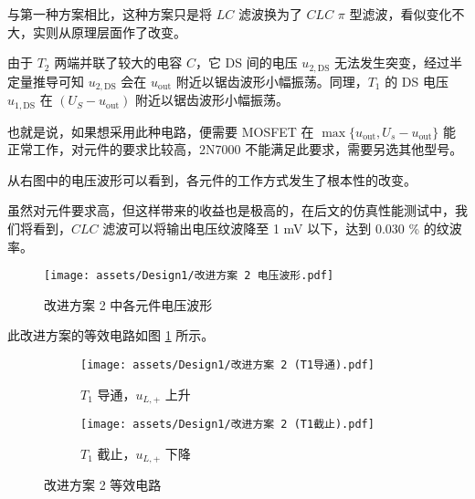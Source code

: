\documentclass[UTF8]{article}
\theoremstyle{MyLineTheoremStyle} %
\theoremstyle{MyBlockTheoremStyle} %
\theoremstyle{MySubsubsectionStyle} %
\begin{document}
\begin{center}
\noindent\begin{minipage}{0.42\columnwidth}
    \hspace*{2em} 与第一种方案相比，这种方案只是将 $LC$ 滤波换为了 $CLC$ $\pi$ 型滤波，看似变化不大，实则从原理层面作了改变。
    
    \hspace*{2em} 由于 $T_2$ 两端并联了较大的电容 $C$，它 DS 间的电压 $u_{2, \text{DS}}$ 无法发生突变，经过半定量推导可知 $u_{2, \text{DS}}$ 会在 $u_{\text{out}}$ 附近以锯齿波形小幅振荡。同理，$T_1$ 的 DS 电压 $u_{1, \text{DS}}$ 在 $(U_S - u_{\text{out}})$ 附近以锯齿波形小幅振荡。
    
    \hspace*{2em} 也就是说，如果想采用此种电路，便需要 MOSFET 在  $\max \{u_{\text{out}} , U_s - u_{\text{out}}\}$ 能正常工作，对元件的要求比较高，2N7000 不能满足此要求，需要另选其他型号。
    
    \hspace*{2em} 从右图中的电压波形可以看到，各元件的工作方式发生了根本性的改变。

    \hspace*{2em} 虽然对元件要求高，但这样带来的收益也是极高的，在后文的仿真性能测试中，我们将看到，$CLC$ 滤波可以将输出电压纹波降至 1 mV 以下，达到 0.030   \% 的纹波率。
    \hspace*{2em} 
\end{minipage}\hspace*{8mm}\begin{minipage}{0.45\columnwidth}
    \begin{figure}[H]\centering
        \texttt{[image: assets/Design1/改进方案 2 电压波形.pdf]}
        \caption{改进方案 2 中各元件电压波形}
    \end{figure}
\end{minipage}\end{center}

此改进方案的等效电路如图 \ref{改进方案 2 等效电路} 所示。
\begin{figure}[H]\centering
\begin{subfigure}[b]{0.5\columnwidth}\centering
    \texttt{[image: assets/Design1/改进方案 2 (T1导通).pdf]}
    \caption{$T_1$ 导通，$u_{L, +}$ 上升}
\end{subfigure}\hfill
\begin{subfigure}[b]{0.5\columnwidth}\centering
    \texttt{[image: assets/Design1/改进方案 2 (T1截止).pdf]}
    \caption{$T_1$ 截止，$u_{L, +}$ 下降}
\end{subfigure}
\caption{改进方案 2 等效电路}
\label{改进方案 2 等效电路}
\end{figure}
\end{document}
